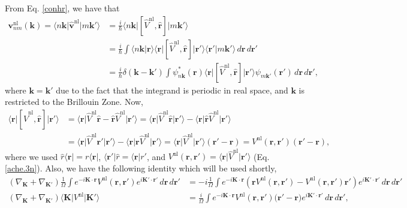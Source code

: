 From Eq. \eqref{conhr}, we have that
\begin{align}\label{vnln.0}
\mathbf{v}^\mathrm{nl}_{nm}(\mathbf{k})
 = \langle n\mathbf{k}\vert\hat{\mathbf{v}}^\mathrm{nl}\vert m\mathbf{k}'\rangle
&= \frac{i}{\hbar}\langle n\mathbf{k}\vert
   \left[\hat{V}^\mathrm{nl},\hat{\mathbf{r}}\right]
   \vert m\mathbf{k}'\rangle\nonumber\\
&= \frac{i}{\hbar}\int
   \langle n\mathbf{k}\vert\mathbf{r}\rangle
   \langle\mathbf{r}\vert
   \left[\hat{V}^\mathrm{nl},\hat{\mathbf{r}}\right]
   \vert\mathbf{r}'\rangle
   \langle\mathbf{r}'\vert m\mathbf{k}'\rangle
   \,d\mathbf{r}\,d\mathbf{r}'\nonumber\\
&= \frac{i}{\hbar}\delta(\mathbf{k}-\mathbf{k}')\int 
   \psi^{*}_{n\mathbf{k}}(\mathbf{r})
   \langle\mathbf{r}\vert
   \left[\hat{V}^\mathrm{nl},\hat{\mathbf{r}}\right]
   \vert\mathbf{r}'\rangle
   \psi_{m\mathbf{k}'}(\mathbf{r}')
   \,d\mathbf{r}\,d\mathbf{r}',
\end{align}   
where $\mathbf{k}=\mathbf{k}'$ due to the fact that the integrand is periodic in
real space, and $\mathbf{k}$ is restricted to the Brillouin Zone. Now,
\begin{align}\label{vnln.1}
\langle\mathbf{r}\vert
\left[\hat{V}^\mathrm{nl},\hat{\mathbf{r}}\right]
\vert\mathbf{r}'\rangle
&= \langle\mathbf{r}\vert\hat{V}^\mathrm{nl}\hat{\mathbf{r}}
   - \hat{\mathbf{r}}\hat{V}^\mathrm{nl}\vert\mathbf{r}'\rangle
 = \langle\mathbf{r}\vert
   \hat{V}^\mathrm{nl}\hat{\mathbf{r}}
   \vert\mathbf{r}'\rangle
   - \langle\mathbf{r}\vert
     \hat{\mathbf{r}}\hat{V}^\mathrm{nl}
     \vert\mathbf{r}'\rangle\nonumber\\
&= \langle\mathbf{r}\vert\hat{V}^\mathrm{nl} \mathbf{r}'\vert\mathbf{r}'\rangle
   - \langle\mathbf{r}\vert\mathbf{r}\hat{V}^\mathrm{nl}\vert\mathbf{r}'\rangle
 = \langle\mathbf{r}\vert\hat{V}^\mathrm{nl}\vert\mathbf{r}'\rangle
   (\mathbf{r}'-\mathbf{r})
 = V^\mathrm{nl}(\mathbf{r},\mathbf{r}')(\mathbf{r}'-\mathbf{r}),
\end{align}
where we used $\hat{r}\langle\mathbf{r}\vert = r\langle\mathbf{r}\vert$,
$\langle\mathbf{r}'\vert\hat{r} = \langle\mathbf{r}\vert r'$, and
$V^\mathrm{nl}(\mathbf{r},\mathbf{r}') =
\langle\mathbf{r}\vert\hat{V}^\mathrm{nl}\vert\mathbf{r}'\rangle$
(Eq. \eqref{ache.3n}). Also, we have the following identity which will be used
shortly,
\begin{align}\label{cn51}
(\nabla_\mathbf{K}+\nabla_{\mathbf{K}'})\frac{1}{\Omega}\int e^{-i\mathbf{K}\cdot\mathbf{r}}V^\mathrm{nl}(\mathbf{r},\mathbf{r}')e^{i\mathbf{K}'\cdot\mathbf{r}'}\,d\mathbf{r}\,d\mathbf{r}'
&= -i \frac{1}{\Omega} \int e^{-i\mathbf{K}\cdot\mathbf{r}} \left(\mathbf{r} V^\mathrm{nl}(\mathbf{r},\mathbf{r}') - V^\mathrm{nl}(\mathbf{r},\mathbf{r}') \mathbf{r}'\right) e^{i\mathbf{K}'\cdot\mathbf{r}'} \,d\mathbf{r}\,d\mathbf{r}'\nonumber\\ (\nabla_\mathbf{K}+\nabla_{\mathbf{K}'}) \langle\mathbf{K}\vert V^\mathrm{nl} \vert\mathbf{K}'\rangle
&= \frac{i}{\Omega} \int e^{-i\mathbf{K}\cdot\mathbf{r}} V^\mathrm{nl}(\mathbf{r},\mathbf{r}') \big(\mathbf{r}'- \mathbf{r} \big) e^{i\mathbf{K}'\cdot\mathbf{r}'} \,d\mathbf{r}\,d\mathbf{r}',
\end{align}
